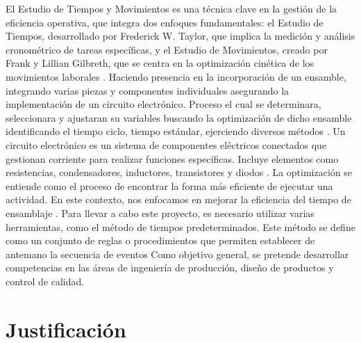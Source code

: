    El Estudio de Tiempos y Movimientos es una técnica clave en la gestión de la eficiencia operativa, que integra dos enfoques fundamentales: el Estudio de Tiempos, desarrollado por Frederick W. Taylor, que implica la medición y análisis cronométrico de tareas específicas, y el Estudio de Movimientos, creado por Frank y Lillian Gilbreth, que se centra en la optimización cinética de los movimientos laborales \cite{Maynards}.
    Haciendo presencia en la incorporación de un ensamble, integrando varias piezas y componentes individuales asegurando la implementación de un circuito electrónico. Proceso el cual se determinara, seleccionara y ajustaran su variables buscando la optimización de dicho ensamble identificando el tiempo ciclo, tiempo estándar, ejerciendo diversos métodos \cite{glossar_item24}. 
    Un circuito electrónico es un sistema de componentes eléctricos conectados que gestionan corriente para realizar funciones específicas. Incluye elementos como resistencias, condensadores, inductores, transistores y diodos \cite{fadesaing_circuitos}.
    La optimización se entiende como el proceso de encontrar la forma más eficiente de ejecutar una actividad. En este contexto, nos enfocamos en mejorar la eficiencia del tiempo de ensamblaje \cite{significados_optimizacion}.
    Para llevar a cabo este proyecto, es necesario utilizar varias herramientas, como el método de tiempos predeterminados. Este método se define como un conjunto de reglas o procedimientos que permiten establecer de antemano la secuencia de eventos \cite{H.B.MAYNARD}
    Como objetivo general, se pretende desarrollar competencias en las áreas de ingeniería de producción, diseño de productos y control de calidad.
    
   
    
    \section{Justificación}

